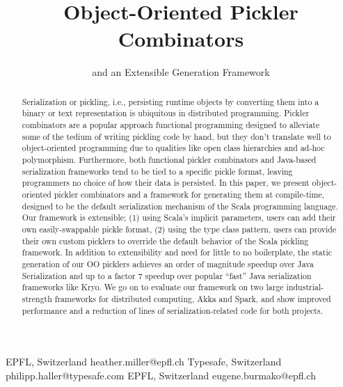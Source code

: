 \documentclass[preprint,10pt]{sigplanconf}
\begin{document}
\copyrightdata{[to be supplied]}


\title{Object-Oriented Pickler Combinators}
\subtitle{and an Extensible Generation Framework}

           {EPFL, Switzerland}
           {heather.miller@epfl.ch}
           {Typesafe, Switzerland}
           {philipp.haller@typesafe.com}
           {EPFL, Switzerland}
           {eugene.burmako@epfl.ch}

\maketitle

\begin{abstract}

Serialization or pickling, i.e., persisting runtime objects by converting them
into a binary or text representation is ubiquitous in distributed programming.
Pickler combinators are a popular approach functional programming designed to
alleviate some of the tedium of writing pickling code by hand, but they don't
translate well to object-oriented programming due to qualities like open class
hierarchies and ad-hoc polymorphism. Furthermore, both functional pickler
combinators and Java-based serialization frameworks tend to be tied to a
specific pickle format, leaving programmers no choice of how their data is
persisted. In this paper, we present object-oriented pickler combinators and a
framework for generating them at compile-time, designed to be the default
serialization mechanism of the Scala programming language. Our framework is
extensible; (1) using Scala's implicit parameters, users can add their own
easily-swappable pickle format, (2) using the type class pattern, users can
provide their own custom picklers to override the default behavior of the
Scala pickling framework. In addition to extensibility and need for little to
no boilerplate, the static generation of our OO picklers achieves an order of
magnitude speedup over Java Serialization and up to a factor 7 speedup over
popular ``fast'' Java serialization frameworks like Kryo. We go on to evaluate
our framework on two large industrial-strength frameworks for distributed
computing, Akka and Spark, and show improved performance and a reduction of
lines of serialization-related code for both projects.

\end{abstract}
\end{document}
